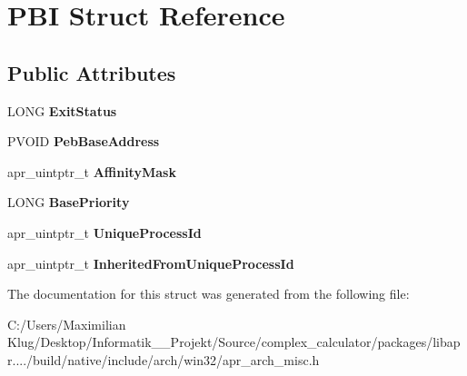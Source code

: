 \hypertarget{struct_p_b_i}{}\section{P\+BI Struct Reference}
\label{struct_p_b_i}
\subsection*{Public Attributes}
\begin{DoxyCompactItemize}
\item 
\mbox{\label{struct_p_b_i_a9b57cf72fceb11a02dfca9daad2647cc}} 
L\+O\+NG {\bfseries Exit\+Status}
\item 
\mbox{\label{struct_p_b_i_a5848b9b53bcd57ebb2c876d7af3e9581}} 
P\+V\+O\+ID {\bfseries Peb\+Base\+Address}
\item 
\mbox{\label{struct_p_b_i_acecc7a82cf226f2fa36c28fcb6ee5606}} 
apr\+\_\+uintptr\+\_\+t {\bfseries Affinity\+Mask}
\item 
\mbox{\label{struct_p_b_i_a5a3932ba93edb16616d47c2c0c254999}} 
L\+O\+NG {\bfseries Base\+Priority}
\item 
\mbox{\label{struct_p_b_i_ab705a75e976b129d6865e231ec46e366}} 
apr\+\_\+uintptr\+\_\+t {\bfseries Unique\+Process\+Id}
\item 
\mbox{\label{struct_p_b_i_ad0be39a0e592d4764d0b019466a67770}} 
apr\+\_\+uintptr\+\_\+t {\bfseries Inherited\+From\+Unique\+Process\+Id}
\end{DoxyCompactItemize}


The documentation for this struct was generated from the following file\+:\begin{DoxyCompactItemize}
\item 
C\+:/\+Users/\+Maximilian Klug/\+Desktop/\+Informatik\+\_\+\_\+\+Projekt/\+Source/complex\+\_\+calculator/packages/libapr..../build/native/include/arch/win32/apr\+\_\+arch\+\_\+misc.\+h\end{DoxyCompactItemize}

